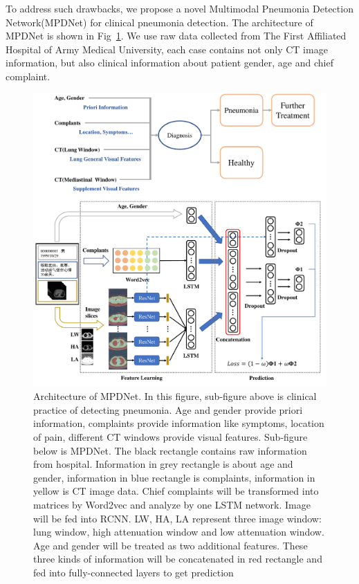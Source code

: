 \documentclass[journal]{IEEEtran}
\begin{document}
To address such drawbacks, we propose a novel Multimodal Pneumonia Detection Network(MPDNet) for clinical pneumonia detection. The architecture of MPDNet is shown in Fig~\ref{MMDD}. We use raw data collected from The First Affiliated Hospital of Army Medical University, each case contains not only CT image information, but also clinical information about patient gender, age and chief complaint. 
\begin{figure}[t]
    \centerline{\includegraphics[width=150mm]{MMDD.pdf}}
    \vspace{-0cm}
    \caption{Architecture of MPDNet. 
    In this figure, sub-figure above is clinical practice of detecting pneumonia. Age and gender provide priori information, complaints provide information like symptoms, location of pain, different CT windows provide visual features.
    Sub-figure below is MPDNet. The black rectangle contains raw information from hospital. Information in grey rectangle is about age and gender, information in blue rectangle is complaints, information in yellow is CT image data. Chief complaints will be transformed into matrices by Word2vec and analyze by one LSTM network. Image will be fed into RCNN. LW, HA, LA represent three image window: lung window, high attenuation window and low attenuation window. Age and gender will be treated as two additional features. These three kinds of information will be concatenated in red rectangle and fed into fully-connected layers to get prediction}
    \vspace{-0cm}
    \label{MMDD}
    \end{figure}
\end{document}
